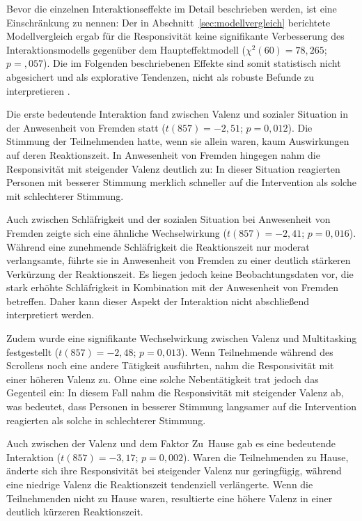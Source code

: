 \documentclass[11pt,a4paper]{article}
\begin{document}
Bevor die einzelnen Interaktionseffekte im Detail beschrieben werden, ist eine Einschränkung
zu nennen: Der in Abschnitt~\ref{sec:modellvergleich} berichtete Modellvergleich ergab für die
Responsivität keine signifikante Verbesserung des Interaktionsmodells gegenüber dem
Haupteffektmodell ($\chi^2(60) = 78{,}265$; $p = {,}057$). Die im Folgenden beschriebenen
Effekte sind somit statistisch nicht abgesichert und als explorative Tendenzen, nicht als
robuste Befunde zu interpretieren \citep{meinhardt2025scrolling}.

Die erste bedeutende Interaktion fand zwischen Valenz und sozialer Situation in der
Anwesenheit von Fremden statt ($t(857)=-2{,}51$; $p=0{,}012$). Die Stimmung der
Teilnehmenden hatte, wenn sie allein waren, kaum Auswirkungen auf deren Reaktionszeit. In
Anwesenheit von Fremden hingegen nahm die Responsivität mit steigender Valenz deutlich zu:
In dieser Situation reagierten Personen mit besserer Stimmung merklich schneller auf die
Intervention als solche mit schlechterer Stimmung.

Auch zwischen Schläfrigkeit und der sozialen Situation bei Anwesenheit von Fremden zeigte
sich eine ähnliche Wechselwirkung ($t(857)=-2{,}41$; $p=0{,}016$). Während eine zunehmende
Schläfrigkeit die Reaktionszeit nur moderat verlangsamte, führte sie in Anwesenheit von
Fremden zu einer deutlich stärkeren Verkürzung der Reaktionszeit. Es liegen jedoch keine
Beobachtungsdaten vor, die stark erhöhte Schläfrigkeit in Kombination mit der Anwesenheit
von Fremden betreffen. Daher kann dieser Aspekt der Interaktion nicht abschließend
interpretiert werden.

Zudem wurde eine signifikante Wechselwirkung zwischen Valenz und Multitasking festgestellt
($t(857)=-2{,}48$; $p=0{,}013$). Wenn Teilnehmende während des Scrollens noch eine andere
Tätigkeit ausführten, nahm die Responsivität mit einer höheren Valenz zu. Ohne eine solche
Nebentätigkeit trat jedoch das Gegenteil ein: In diesem Fall nahm die Responsivität mit
steigender Valenz ab, was bedeutet, dass Personen in besserer Stimmung langsamer auf die
Intervention reagierten als solche in schlechterer Stimmung.

Auch zwischen der Valenz und dem Faktor Zu~Hause gab es eine bedeutende Interaktion
($t(857)=-3{,}17$; $p=0{,}002$). Waren die Teilnehmenden zu Hause, änderte sich ihre
Responsivität bei steigender Valenz nur geringfügig, während eine niedrige Valenz die
Reaktionszeit tendenziell verlängerte. Wenn die Teilnehmenden nicht zu Hause waren,
resultierte eine höhere Valenz in einer deutlich kürzeren Reaktionszeit.
\end{document}
